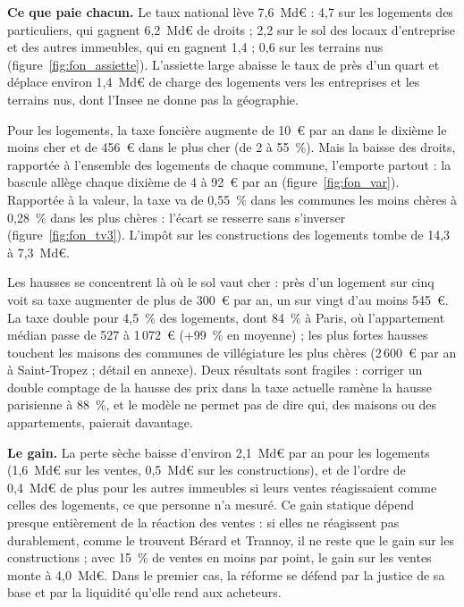 \textbf{Ce que paie chacun.} Le taux national lève 7,6~Md€ : 4,7 sur les logements des particuliers, qui gagnent 6,2~Md€
de droits ; 2,2 sur le sol des locaux d'entreprise et des autres immeubles, qui en gagnent 1,4 ; 0,6 sur les terrains nus
(figure~\ref{fig:fon_assiette}). L'assiette large abaisse le taux de près d'un quart et déplace environ 1,4~Md€ de charge
des logements vers les entreprises et les terrains nus, dont l'Insee ne donne pas la géographie.


Pour les logements, la taxe foncière augmente de 10~€ par an dans le dixième le moins cher et de 456~€ dans le plus cher
(de 2 à 55~\%). Mais la baisse des droits, rapportée à l'ensemble des logements de chaque commune, l'emporte partout : la
bascule allège chaque dixième de 4 à 92~€ par an (figure~\ref{fig:fon_var}). Rapportée à la valeur, la taxe va de
0,55~\% dans les communes les moins chères à 0,28~\% dans les plus chères : l'écart se resserre sans s'inverser
(figure~\ref{fig:fon_tv3}). L'impôt sur les constructions des logements tombe de 14,3 à 7,3~Md€.


Les hausses se concentrent là où le sol vaut cher : près d'un logement sur cinq voit sa taxe augmenter de plus de 300~€
par an, un sur vingt d'au moins 545~€. La taxe double pour 4,5~\% des logements, dont 84~\% à Paris, où l'appartement
médian passe de 527 à 1\,072~€ (+99~\% en moyenne) ; les plus fortes hausses touchent les maisons des communes de
villégiature les plus chères (2\,600~€ par an à Saint-Tropez ; détail en annexe). Deux résultats sont fragiles : corriger
un double comptage de la hausse des prix dans la taxe actuelle ramène la hausse parisienne à 88~\%, et le modèle ne
permet pas de dire qui, des maisons ou des appartements, paierait davantage.

\textbf{Le gain.} La perte sèche baisse d'environ 2,1~Md€ par an pour les logements (1,6~Md€ sur les ventes, 0,5~Md€ sur
les constructions), et de l'ordre de 0,4~Md€ de plus pour les autres immeubles si leurs ventes réagissaient comme celles
des logements, ce que personne n'a mesuré. Ce gain statique dépend presque entièrement de la réaction des ventes : si
elles ne réagissent pas durablement, comme le trouvent Bérard et Trannoy, il ne reste que le gain sur les constructions ;
avec 15~\% de ventes en moins par point, le gain sur les ventes monte à 4,0~Md€. Dans le premier cas, la réforme se
défend par la justice de sa base et par la liquidité qu'elle rend aux acheteurs.

